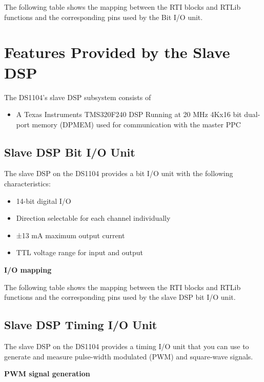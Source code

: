 The following table shows the mapping between the RTI blocks and RTLib functions and the corresponding pins used by the Bit I/O unit.



\newpage

\section{Features Provided by the Slave DSP}
The DS1104’s slave DSP subsystem consists of
\begin{itemize}
    \item A Texas Instruments TMS320F240 DSP
    \subitem Running at 20 MHz
    \subitem 4Kx16 bit dual-port memory (DPMEM) used for communication with the master PPC
\end{itemize}

\subsection{Slave DSP Bit I/O Unit}
The slave DSP on the DS1104 provides a bit I/O unit with the following characteristics:
\begin{itemize}
    \item 14-bit digital I/O
    \item Direction selectable for each channel individually
    \item ±13 mA maximum output current
    \item TTL voltage range for input and output
\end{itemize}

\noindent \textbf{I/O mapping }\par

The following table shows the mapping between the RTI blocks and RTLib functions and the corresponding pins used by the slave DSP bit I/O unit.



\subsection{Slave DSP Timing I/O Unit}

The slave DSP on the DS1104 provides a timing I/O unit that you can use to generate and measure pulse-width modulated (PWM) and square-wave signals.

\noindent \textbf{PWM signal generation}\par

